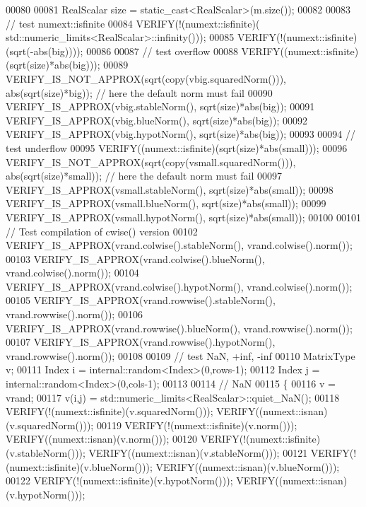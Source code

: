 \begin{DoxyCode}
00080 
00081   RealScalar size = \textcolor{keyword}{static\_cast<}RealScalar\textcolor{keyword}{>}(m.size());
00082 
00083   \textcolor{comment}{// test numext::isfinite}
00084   VERIFY(!(numext::isfinite)( std::numeric\_limits<RealScalar>::infinity()));
00085   VERIFY(!(numext::isfinite)(sqrt(-abs(big))));
00086 
00087   \textcolor{comment}{// test overflow}
00088   VERIFY((numext::isfinite)(sqrt(size)*abs(big)));
00089   VERIFY\_IS\_NOT\_APPROX(sqrt(copy(vbig.squaredNorm())), abs(sqrt(size)*big)); \textcolor{comment}{// here the default norm must
       fail}
00090   VERIFY\_IS\_APPROX(vbig.stableNorm(), sqrt(size)*abs(big));
00091   VERIFY\_IS\_APPROX(vbig.blueNorm(),   sqrt(size)*abs(big));
00092   VERIFY\_IS\_APPROX(vbig.hypotNorm(),  sqrt(size)*abs(big));
00093 
00094   \textcolor{comment}{// test underflow}
00095   VERIFY((numext::isfinite)(sqrt(size)*abs(small)));
00096   VERIFY\_IS\_NOT\_APPROX(sqrt(copy(vsmall.squaredNorm())),   abs(sqrt(size)*small)); \textcolor{comment}{// here the default norm
       must fail}
00097   VERIFY\_IS\_APPROX(vsmall.stableNorm(), sqrt(size)*abs(small));
00098   VERIFY\_IS\_APPROX(vsmall.blueNorm(),   sqrt(size)*abs(small));
00099   VERIFY\_IS\_APPROX(vsmall.hypotNorm(),  sqrt(size)*abs(small));
00100 
00101   \textcolor{comment}{// Test compilation of cwise() version}
00102   VERIFY\_IS\_APPROX(vrand.colwise().stableNorm(),      vrand.colwise().norm());
00103   VERIFY\_IS\_APPROX(vrand.colwise().blueNorm(),        vrand.colwise().norm());
00104   VERIFY\_IS\_APPROX(vrand.colwise().hypotNorm(),       vrand.colwise().norm());
00105   VERIFY\_IS\_APPROX(vrand.rowwise().stableNorm(),      vrand.rowwise().norm());
00106   VERIFY\_IS\_APPROX(vrand.rowwise().blueNorm(),        vrand.rowwise().norm());
00107   VERIFY\_IS\_APPROX(vrand.rowwise().hypotNorm(),       vrand.rowwise().norm());
00108   
00109   \textcolor{comment}{// test NaN, +inf, -inf }
00110   MatrixType v;
00111   Index i = internal::random<Index>(0,rows-1);
00112   Index j = internal::random<Index>(0,cols-1);
00113 
00114   \textcolor{comment}{// NaN}
00115   \{
00116     v = vrand;
00117     v(i,j) = std::numeric\_limits<RealScalar>::quiet\_NaN();
00118     VERIFY(!(numext::isfinite)(v.squaredNorm()));   VERIFY((numext::isnan)(v.squaredNorm()));
00119     VERIFY(!(numext::isfinite)(v.norm()));          VERIFY((numext::isnan)(v.norm()));
00120     VERIFY(!(numext::isfinite)(v.stableNorm()));    VERIFY((numext::isnan)(v.stableNorm()));
00121     VERIFY(!(numext::isfinite)(v.blueNorm()));      VERIFY((numext::isnan)(v.blueNorm()));
00122     VERIFY(!(numext::isfinite)(v.hypotNorm()));     VERIFY((numext::isnan)(v.hypotNorm()));

\end{DoxyCode}
